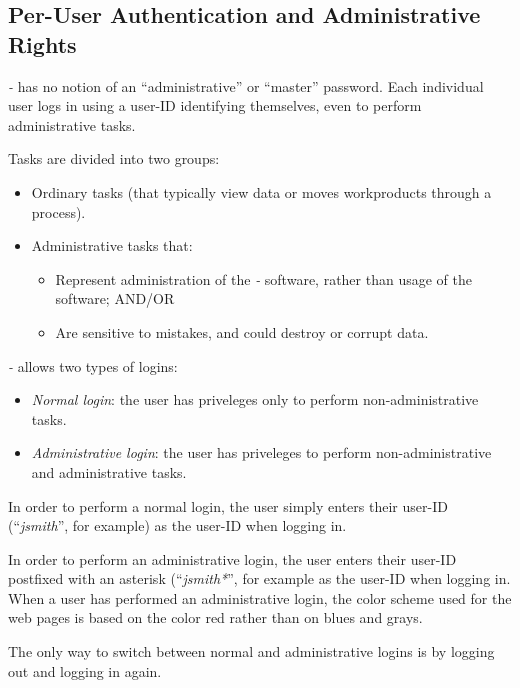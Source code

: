 \subsection{Per-User Authentication and Administrative Rights}
\label{ctbg0:sddc0:spua0}

\emph{\productbasename{}-\productversion{}} has no notion of an
``administrative'' or ``master'' password.  Each individual user
logs in using a user-ID identifying themselves, even to perform
administrative tasks.

Tasks are divided into two groups:

\begin{itemize}
\item Ordinary tasks (that typically view data or moves workproducts
      through a process).
\item Administrative tasks that:
      \begin{itemize}
      \item Represent administration of the \emph{\productbasename{}-\productversion{}}
            software, rather than usage of the software; AND/OR
      \item Are sensitive to mistakes, and could destroy or corrupt 
            data.
      \end{itemize}
\end{itemize}

\emph{\productbasename{}-\productversion{}} allows two types of logins:

\begin{itemize}
\item \emph{Normal login}:  the user has priveleges only to perform
      non-administrative tasks.
\item \emph{Administrative login}:  the user has priveleges to perform
      non-administrative and administrative tasks.
\end{itemize}

In order to perform a normal login, the user simply enters their
user-ID (``\emph{jsmith}'', for example) as the user-ID when logging in.

In order to perform an administrative login, the user enters their
user-ID postfixed with an asterisk (``\emph{jsmith*}'', for
example as the user-ID when logging in.  When a user has performed an
administrative login, the color scheme used for the web pages
is based on the color red rather than on blues and grays.

The only way to switch between normal and administrative logins 
is by logging out and logging in again.



